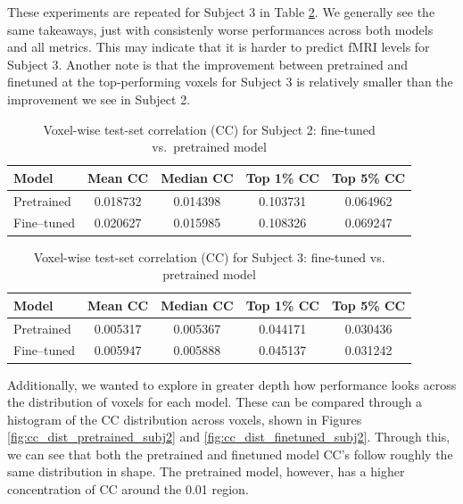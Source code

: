 \documentclass[10pt,letterpaper]{article}
\begin{document}
These experiments are repeated for Subject 3 in Table \ref{tab:cc_subject3_comparison_finetuned_vs_pretrained}. We generally see the same takeaways, just with consistenly worse performances across both models and all metrics. This may indicate that it is harder to predict fMRI levels for Subject 3. Another note is that the improvement between pretrained and finetuned at the top-performing voxels for Subject 3 is relatively smaller than the improvement we see in Subject 2.


\begin{table}[ht]
\centering
\caption{Voxel-wise test-set correlation (CC) for Subject 2: fine-tuned vs.\ pretrained model}
\label{tab:cc_subject2_comparison_finetuned_vs_pretrained}
\begin{tabular}{lcccc}
\toprule
\textbf{Model} & \textbf{Mean CC} & \textbf{Median CC} & \textbf{Top 1\% CC} & \textbf{Top 5\% CC} \\
\midrule
Pretrained & 0.018732 & 0.014398 & 0.103731 & 0.064962 \\
Fine–tuned & 0.020627 & 0.015985 & 0.108326 & 0.069247 \\
\bottomrule
\end{tabular}
\end{table}


\begin{table}[h!]
\centering
\caption{Voxel-wise test-set correlation (CC) for Subject 3: fine-tuned vs. pretrained model}
\label{tab:cc_subject3_comparison_finetuned_vs_pretrained}
\begin{tabular}{lcccc}
\toprule
\textbf{Model} & \textbf{Mean CC} & \textbf{Median CC} & \textbf{Top 1\% CC} & \textbf{Top 5\% CC} \\
\midrule
Pretrained & 0.005317 & 0.005367 & 0.044171 & 0.030436 \\
Fine–tuned & 0.005947 & 0.005888 & 0.045137 & 0.031242 \\
\bottomrule
\end{tabular}
\end{table}



Additionally, we wanted to explore in greater depth how performance looks across the distribution of voxels for each model. These can be compared through a histogram of the CC distribution across voxels, shown in Figures \ref{fig:cc_dist_pretrained_subj2} and \ref{fig:cc_dist_finetuned_subj2}. Through this, we can see that both the pretrained and finetuned model CC's follow roughly the same distribution in shape. The pretrained model, however, has a higher concentration of CC around the 0.01 region.
\end{document}

